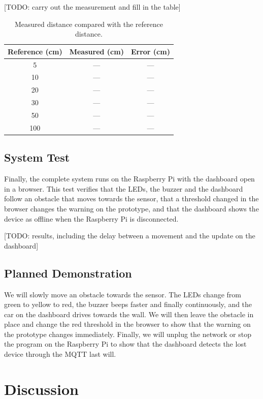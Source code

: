 \documentclass[11pt,a4paper]{article}
\newcommand{\todo}[1]{\textcolor{red!75!black}{[TODO: #1]}}
\begin{document}
\todo{carry out the measurement and fill in the table}

\begin{table}[htbp]
  \centering
  \caption{Measured distance compared with the reference distance.}
  \label{tab:accuracy}
  \begin{tabular}{@{}ccc@{}}
    \toprule
    Reference (\unit{\centi\metre}) & Measured (\unit{\centi\metre}) & Error (\unit{\centi\metre}) \\
    \midrule
    5   & --- & --- \\
    10  & --- & --- \\
    20  & --- & --- \\
    30  & --- & --- \\
    50  & --- & --- \\
    100 & --- & --- \\
    \bottomrule
  \end{tabular}
\end{table}

\subsection{System Test}
Finally, the complete system runs on the Raspberry Pi with the dashboard open in
a browser. This test verifies that the LEDs, the buzzer and the dashboard follow
an obstacle that moves towards the sensor, that a threshold changed in the
browser changes the warning on the prototype, and that the dashboard shows the
device as offline when the Raspberry Pi is disconnected.

\todo{results, including the delay between a movement and the update on the dashboard}

\subsection{Planned Demonstration}
We will slowly move an obstacle towards the sensor. The LEDs change from green
to yellow to red, the buzzer beeps faster and finally continuously, and the car
on the dashboard drives towards the wall. We will then leave the obstacle in
place and change the red threshold in the browser to show that the warning on
the prototype changes immediately. Finally, we will unplug the network or stop
the program on the Raspberry Pi to show that the dashboard detects the lost
device through the MQTT last will.

\section{Discussion}
\label{sec:discussion}
\end{document}
